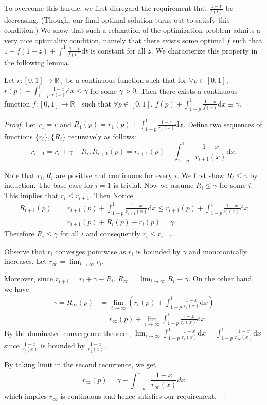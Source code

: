 \documentclass{article}
\begin{document}
To overcome this hurdle, we first disregard the requirement that $\frac{1-t}{f(t)}$ be decreasing. (Though, our final optimal solution turns out to satisfy this condition.) We show that such a relaxation of the optimization problem admits a very nice optimality condition, namely that there exists some optimal $f$ such that $1+f(1-z)+\int_z^1 \frac{1-t}{f(t)}\mathrm{d}t$ is constant for all $z$. We characterize this property in the following lemma.
\begin{lemma}
Let $r:[0,1]\longrightarrow\mathbb{R}_{+}$ be a
continuous function such that for $\forall p\in [0,1]$, $r(p)+\int_{1-p}^{1}\frac{1-x}{r(x)}\mathrm{d}x\leq\gamma$
for some $\gamma>0$. Then there exists a continuous function $f:[0,1]\longrightarrow\mathbb{R}_{+}$
such that $\forall p\in [0,1]$, $f(p)+\int_{1-p}^{1}\frac{1-x}{f(x)}\mathrm{d}x \equiv\gamma$.
\end{lemma}
\begin{proof}
Let $r_{1}=r$ and $R_{1}(p)=r_{1}(p)+\int_{1-p}^{1}\frac{1-x}{r_{1}(x)}\mathrm{d}x$.
Define two sequences of functions $\{r_{i}\},\{R_{i}\}$ recursively
as follows:
\[
r_{i+1}=r_{i}+\gamma-R_{i},R_{i+1}(p)=r_{i+1}(p)+\int_{1-p}^{1}\frac{1-x}{r_{i+1}(x)}\mathrm{d}x.
\]

Note that $r_{i},R_{i}$ are positive and continuous for every $i$. We first show $R_{i}\leq\gamma$ by induction. The base case for $i=1$ is trivial. Now we assume $R_i\leq \gamma$ for some $i$. This implies that $r_i\leq r_{i+1}$.  Then
Notice 
\begin{align*}
R_{i+1}(p)&=r_{i+1}(p)+\int_{1-p}^{1}\frac{1-x}{r_{i+1}(x)}\mathrm{d}x
\leq r_{i+1}(p) +\int_{1-p}^{1}\frac{1-x}{r_{i}(x)}\mathrm{d}x \\
&=r_{i+1}(p) + R_i(p) - r_i(p) = \gamma.
\end{align*}
Therefore $R_i\le \gamma$ for all $i$ and consequently $r_i\leq r_{i+1}$.

Observe that $r_{i}$ converges pointwise as
$r_{i}$ is bounded by $\gamma$ and monotonically increases. Let $r_{\infty}=\lim_{i\rightarrow\infty}r_{i}$. 

Moreover, since $r_{i+1}=r_{i}+\gamma-R_{i}$, $R_{\infty}=\lim_{i\rightarrow\infty}R_{i}\equiv\gamma$.
On the other hand, we have
\begin{align*}
\gamma=R_{\infty}(p) &=\lim_{i\rightarrow\infty}\left(r_{i}(p)+\int_{1-p}^{1}\frac{1-x}{r_{i}(x)}\mathrm{d}x\right)\\
&=r_{\infty}(p)+\lim_{i\rightarrow\infty}\int_{1-p}^{1}\frac{1-x}{r_{i}(x)}\mathrm{d}x.
\end{align*}
By the dominated convergence theorem, $\lim_{i\rightarrow\infty}\int_{1-p}^{1}\frac{1-x}{r_{i}(x)}\mathrm{d}x=\int_{1-p}^{1}\frac{1-x}{r_{\infty}(x)}\mathrm{d}x$
since $\frac{1-x}{r_{i}(x)}$ is bounded by $\frac{1-x}{r_{1}(x)}$. 

By taking limit in the second recurrence, we get
\[
r_{\infty}(p)=\gamma-\int_{1-p}^{1}\frac{1-x}{r_{\infty}(x)}dx
\]
which implies $r_{\infty}$ is  continuous and hence satisfies our requirement.
\end{proof}
\end{document}
